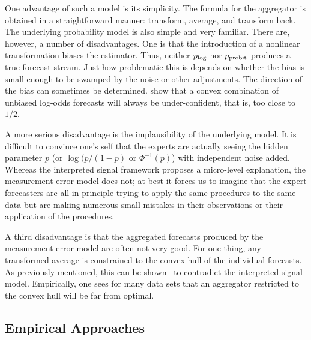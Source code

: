 \documentclass[11pt]{article}
\theoremstyle{definition}
\theoremstyle{definition}
\def\probit{p_{\rm probit}}
\def\plog{p_{\rm log}}
\begin{document}
One advantage of such a model is its simplicity.  The formula
for the aggregator is obtained in a straightforward manner: 
transform, average, and transform back.  The underlying probability
model is also simple and very familiar.  There are, however, a number
of disadvantages.  One is that the introduction of a nonlinear 
transformation biases the estimator.  Thus, neither $\plog$ 
nor $\probit$ produces a true forecast stream.  Just how
problematic this is depends on whether the bias is small enough
to be swamped by the noise or other adjustments.  The direction of
the bias can sometimes be determined.  \citet{Ranjan08}
show that a convex combination of unbiased log-odds forecasts will
always be under-confident, that is, too close to $1/2$.

A more serious disadvantage is the implausibility of the underlying 
model.  It is difficult to convince one's self that the experts
are actually seeing the hidden parameter $p$ (or $\log(p/(1-p)$ 
or $\Phi^{-1} (p)$) with independent noise added.  Whereas the
interpreted signal framework proposes a micro-level explanation,
the measurement error model does not; at best it forces us to 
imagine that the expert forecasters are all in principle trying
to apply the same procedures to the same data but are making
numerous small mistakes in their observations or their application 
of the procedures.  

A third disadvantage is that the aggregated forecasts produced by
the measurement error model are often not very good.  For one thing,
any transformed average is constrained to the convex hull of the
individual forecasts.  As previously mentioned, this can be
shown~\citep{parunak2013characterizing} to contradict the 
interpreted signal model.  Empirically, one sees for many data 
sets that an aggregator restricted to the convex hull will be far 
from optimal.  

\subsection{Empirical Approaches}
\label{ss:empirical}
\end{document}
